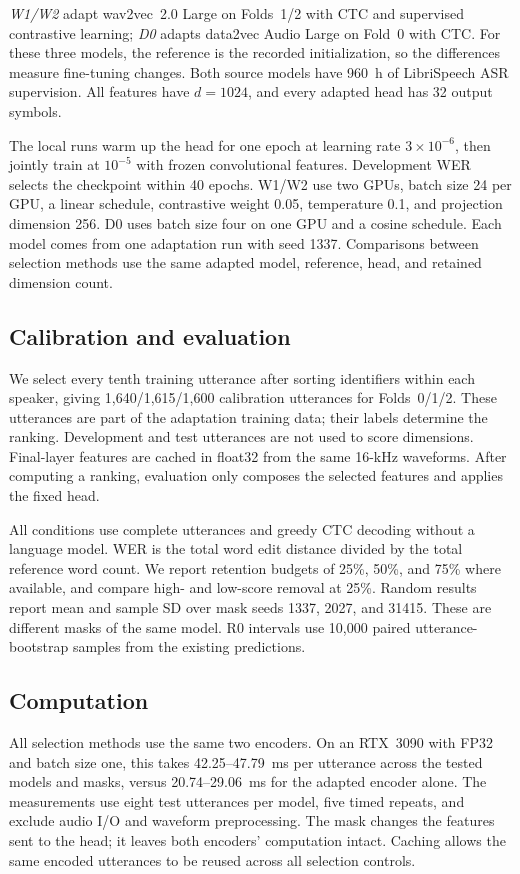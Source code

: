 \documentclass{article}
\begin{document}
\emph{W1/W2} adapt wav2vec~2.0 Large on Folds~1/2 with CTC and supervised contrastive learning; \emph{D0} adapts data2vec Audio Large on Fold~0 with CTC. For these three models, the reference is the recorded initialization, so the differences measure fine-tuning changes. Both source models have 960~h of LibriSpeech ASR supervision. All features have $d=1024$, and every adapted head has 32 output symbols.

The local runs warm up the head for one epoch at learning rate $3\times10^{-6}$, then jointly train at $10^{-5}$ with frozen convolutional features. Development WER selects the checkpoint within 40 epochs. W1/W2 use two GPUs, batch size 24 per GPU, a linear schedule, contrastive weight 0.05, temperature 0.1, and projection dimension 256. D0 uses batch size four on one GPU and a cosine schedule. Each model comes from one adaptation run with seed 1337. Comparisons between selection methods use the same adapted model, reference, head, and retained dimension count.

\subsection{Calibration and evaluation}
We select every tenth training utterance after sorting identifiers within each speaker, giving 1,640/1,615/1,600 calibration utterances for Folds~0/1/2. These utterances are part of the adaptation training data; their labels determine the ranking. Development and test utterances are not used to score dimensions. Final-layer features are cached in float32 from the same 16-kHz waveforms. After computing a ranking, evaluation only composes the selected features and applies the fixed head.

All conditions use complete utterances and greedy CTC decoding without a language model. WER is the total word edit distance divided by the total reference word count. We report retention budgets of 25\%, 50\%, and 75\% where available, and compare high- and low-score removal at 25\%. Random results report mean and sample SD over mask seeds 1337, 2027, and 31415. These are different masks of the same model. R0 intervals use 10,000 paired utterance-bootstrap samples from the existing predictions.

\subsection{Computation}
All selection methods use the same two encoders. On an RTX~3090 with FP32 and batch size one, this takes 42.25--47.79~ms per utterance across the tested models and masks, versus 20.74--29.06~ms for the adapted encoder alone. The measurements use eight test utterances per model, five timed repeats, and exclude audio I/O and waveform preprocessing. The mask changes the features sent to the head; it leaves both encoders' computation intact. Caching allows the same encoded utterances to be reused across all selection controls.
\end{document}
